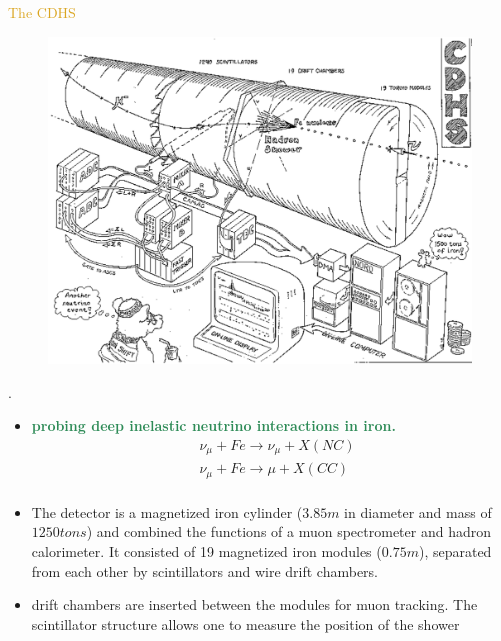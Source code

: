 \documentclass[11pt]{beamer} %
\renewcommand{\(}{\begin{columns}}
\renewcommand{\)}{\end{columns}}
\newcommand{\<}[1]{\begin{column}{#1}}
\renewcommand{\>}{\end{column}}
\newcommand{\itt}{\begin{itemize}}
\newcommand{\tti}{\end{itemize}}
\newcommand{\hlt}[2]{\textcolor{#1}{\textbf{#2}}}
\begin{document}
\begin{frame}{\textcolor{Goldenrod}{The CDHS}}
  \begin{overlayarea}{\textwidth}{\textheight}
  \begin{figure}[h]
    \centering
    \includegraphics[height=0.4\textheight, width=0.8\linewidth]{./Images/cdhscomicb.pdf}
  \end{figure}
  
  .
  
  \itt[<only@+>]
\item \hlt{SeaGreen}{probing deep inelastic neutrino interactions in
    iron.}
  \[
    \begin{aligned} &\nu_{\mu} + Fe \to \nu_{\mu} + X (NC)\\
      &\nu_{\mu} + Fe \to \mu + X (CC)\\
    \end{aligned}
  \]
\item {\small The detector is a magnetized iron cylinder ($3.85 m$ in
    diameter and mass of $1250 tons$) and combined the functions of a muon
    spectrometer and hadron calorimeter. \alert{It consisted of 19
      magnetized iron modules ($0.75m$), separated from each other by
      scintillators and wire drift chambers.}}
\item drift chambers are inserted between the modules for muon
  tracking. The scintillator structure allows one to measure the
  position of the shower
  \tti
\end{overlayarea}
\end{frame}  
\end{document}
